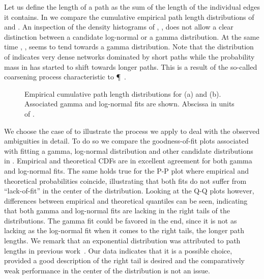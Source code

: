 		Let us define the length of a path as the sum of the length of the individual edges it contains. In  we compare the cumulative empirical path length distributions of  and . An inspection of the density histograms of , , does not allow a clear distinction between a candidate log-normal or a gamma distribution. At the same time , , seems to tend towards a gamma distribution. Note that the distribution of  indicates very dense networks dominated by short paths while the probability mass in  has started to shift towards longer paths. This is a result of the so-called coarsening process characteristic to \P~\cite{baumgarten2010plasmodial}.

		\begin{figure}
			\centering

			\caption[Path length distribution]{Empirical cumulative path length distributions for  (a) and  (b). Associated gamma and log-normal fits are shown. Abscissa in units of \si{\pixel}.}
			\label{fig:path_lengths}
		\end{figure}

		We choose the case of  to illustrate the process we apply to deal with the observed ambiguities in detail. To do so we compare the goodness-of-fit plots associated with fitting a gamma, log-normal distribution and other candidate distributions in . Empirical and theoretical CDFs are in excellent agreement for both gamma and log-normal fits. The same holds true for the P-P plot where empirical and theoretical probabilities coincide, illustrating that both fits do not suffer from ``lack-of-fit'' in the center of the distribution. Looking at the Q-Q plots however, differences between empirical and theoretical quantiles can be seen, indicating that both gamma and log-normal fits are lacking in the right tails of the distributions. The gamma fit could be favored in the end, since it is not as lacking as the log-normal fit when it comes to the right tails, \ie the longer path lengths. We remark that an exponential distribution was attributed to path lengths in previous work~\cite{baumgarten2010plasmodial}. Our data indicates that it is a possible choice, provided a good description of the right tail is desired and the comparatively weak performance in the center of the distribution is not an issue.

